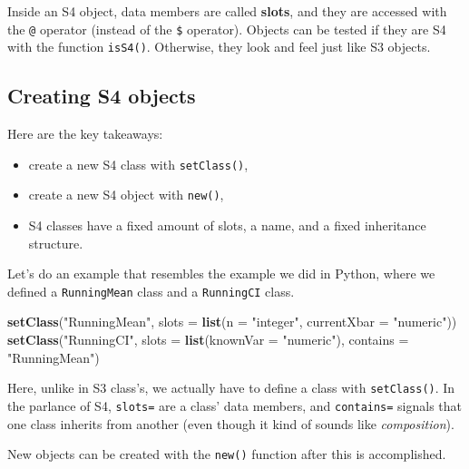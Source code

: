 \documentclass[12pt,krantz2]{krantz}
\makeatletter
\newenvironment{Shaded}{\begin{snugshade}}{\end{snugshade}}
\newcommand{\DataTypeTok}[1]{\textcolor[rgb]{0.27,0.27,0.27}{#1}}
\newcommand{\KeywordTok}[1]{\textcolor[rgb]{0.27,0.27,0.27}{\textbf{#1}}}
\newcommand{\NormalTok}[1]{#1}
\newcommand{\StringTok}[1]{\textcolor[rgb]{0.5,0.5,0.5}{#1}}
\providecommand{\tightlist}{%
  \setlength{\itemsep}{0pt}\setlength{\parskip}{0pt}}
\newenvironment{kframe}{%
\medskip{}
\setlength{\fboxsep}{.8em}
 \def\at@end@of@kframe{}%
 \ifinner\ifhmode%
  \def\at@end@of@kframe{\end{minipage}}%
  \begin{minipage}{\columnwidth}%
 \fi\fi%
 \def\FrameCommand##1{\hskip\@totalleftmargin \hskip-\fboxsep
 \colorbox{shadecolor}{##1}\hskip-\fboxsep
     \hskip-\linewidth \hskip-\@totalleftmargin \hskip\columnwidth}%
 \MakeFramed {\advance\hsize-\width
   \@totalleftmargin\z@ \linewidth\hsize
   \@setminipage}}%
 {\par\unskip\endMakeFramed%
 \at@end@of@kframe}
\renewenvironment{Shaded}{\begin{kframe}}{\end{kframe}}
\makeatother
\begin{document}
Inside an S4 object, data members are called \textbf{slots}, and they are accessed with the \texttt{@} operator (instead of the \texttt{\$} operator). Objects can be tested if they are S4 with the function \texttt{isS4()}. Otherwise, they look and feel just like S3 objects.

\hypertarget{creating-s4-objects}{%
\subsection{Creating S4 objects}\label{creating-s4-objects}}

Here are the key takeaways:

\begin{itemize}
\tightlist
\item
  create a new S4 class with \texttt{setClass()},
\item
  create a new S4 object with \texttt{new()},
\item
  S4 classes have a fixed amount of slots, a name, and a fixed inheritance structure.
\end{itemize}

Let's do an example that resembles the example we did in Python, where we defined a \texttt{RunningMean} class and a \texttt{RunningCI} class.

\begin{Shaded}
\begin{Highlighting}[]
\KeywordTok{setClass}\NormalTok{(}\StringTok{"RunningMean"}\NormalTok{,}
         \DataTypeTok{slots =} \KeywordTok{list}\NormalTok{(}\DataTypeTok{n =} \StringTok{"integer"}\NormalTok{, }
                      \DataTypeTok{currentXbar =} \StringTok{"numeric"}\NormalTok{))}
\KeywordTok{setClass}\NormalTok{(}\StringTok{"RunningCI"}\NormalTok{,}
         \DataTypeTok{slots =} \KeywordTok{list}\NormalTok{(}\DataTypeTok{knownVar =} \StringTok{"numeric"}\NormalTok{),}
         \DataTypeTok{contains =} \StringTok{"RunningMean"}\NormalTok{)}
\end{Highlighting}
\end{Shaded}

Here, unlike in S3 class's, we actually have to define a class with \texttt{setClass()}. In the parlance of S4, \texttt{slots=} are a class' data members, and \texttt{contains=} signals that one class inherits from another (even though it kind of sounds like \emph{composition}).

New objects can be created with the \texttt{new()} function after this is accomplished.
\end{document}
